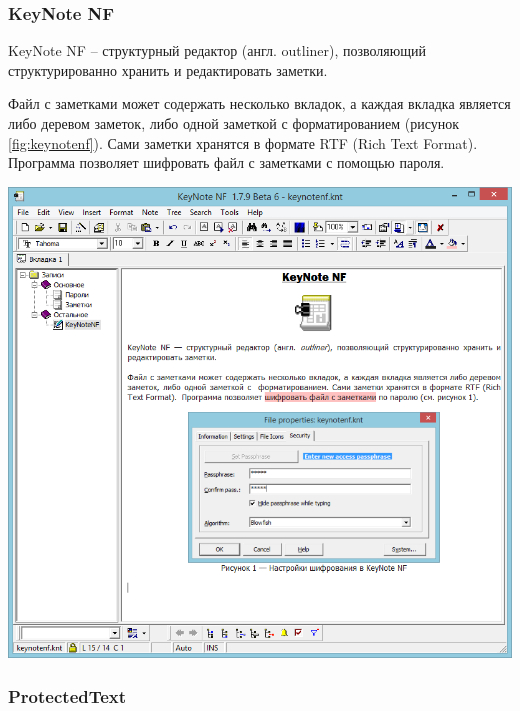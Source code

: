 \newpage
\subsubsection{KeyNote NF}


KeyNote NF -- структурный редактор (англ. outliner), позволяющий
структурированно хранить и редактировать заметки.

Файл с заметками может
содержать несколько вкладок, а каждая вкладка является
либо деревом заметок, либо одной заметкой с форматированием
(рисунок \ref{fig:keynotenf}). Сами заметки хранятся в формате
RTF (Rich Text Format). Программа позволяет шифровать файл
с заметками с помощью пароля.

\noindent
\begin{minipage}{\textwidth}
  \vspace{3.5mm}
  \centering
  \includegraphics[scale=0.6]{./pics/keynote-main.png}
  \label{fig:keynotenf}
  \vspace{3.5mm}
\end{minipage}

\newpage
\subsubsection{ProtectedText}

